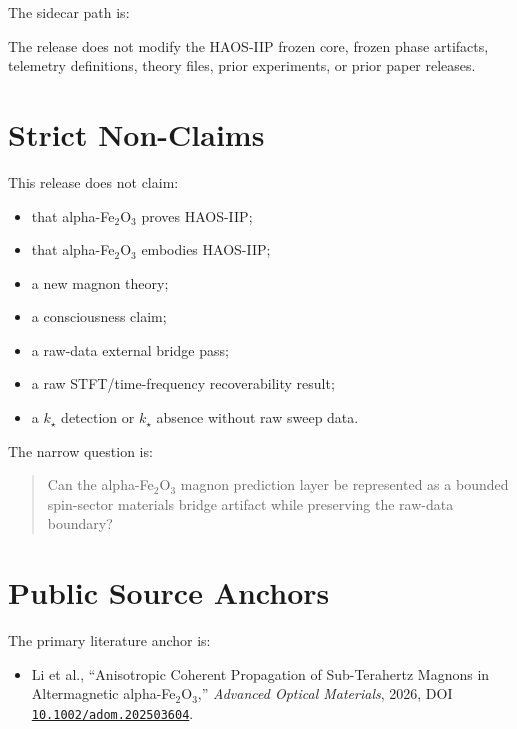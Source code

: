 \documentclass[11pt]{article}
\begin{document}
The sidecar path is:

\begin{quote}
\end{quote}

The release does not modify the HAOS-IIP frozen core, frozen phase artifacts,
telemetry definitions, theory files, prior experiments, or prior paper releases.

\section{Strict Non-Claims}

This release does not claim:

\begin{itemize}
\item that alpha-Fe$_2$O$_3$ proves HAOS-IIP;
\item that alpha-Fe$_2$O$_3$ embodies HAOS-IIP;
\item a new magnon theory;
\item a consciousness claim;
\item a raw-data external bridge pass;
\item a raw STFT/time-frequency recoverability result;
\item a \(k_\star\) detection or \(k_\star\) absence without raw sweep data.
\end{itemize}

The narrow question is:

\begin{quote}
Can the alpha-Fe$_2$O$_3$ magnon prediction layer be represented as a bounded
spin-sector materials bridge artifact while preserving the raw-data boundary?
\end{quote}

\section{Public Source Anchors}

The primary literature anchor is:

\begin{itemize}
\item Li et al., ``Anisotropic Coherent Propagation of Sub-Terahertz Magnons in Altermagnetic alpha-Fe$_2$O$_3$,'' \emph{Advanced Optical Materials}, 2026, DOI \href{https://doi.org/10.1002/adom.202503604}{\texttt{10.1002/adom.202503604}}.
\end{itemize}
\end{document}
